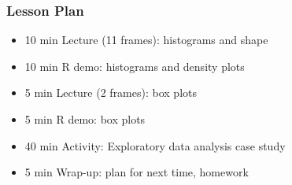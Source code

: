 \begin{frame}
    \frametitle{Lesson Plan}
    \begin{itemize}
        \item 10 min Lecture (11 frames): histograms and shape
        \item 10 min R demo: histograms and density plots 
        \item 5 min Lecture (2 frames): box plots 
        \item 5 min R demo: box plots 
        \item 40 min Activity: Exploratory data analysis case study 
        \item 5 min Wrap-up: plan for next time, homework 
    \end{itemize}
\end{frame}
    
